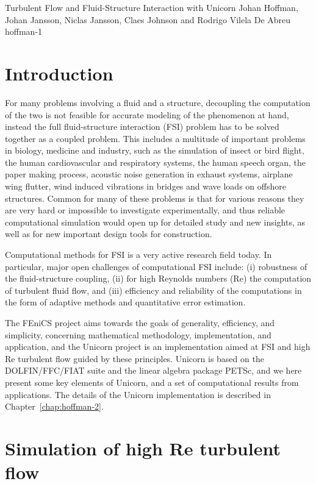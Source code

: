               {Turbulent Flow and Fluid-Structure Interaction with Unicorn} 
              {Johan Hoffman, Johan Jansson, Niclas Jansson, Claes Johnson and Rodrigo Vilela De Abreu}
              {hoffman-1}

\section{Introduction}

For many problems involving a fluid and a structure, decoupling the computation of the two is 
not feasible for accurate modeling of the phenomenon at hand, instead the full fluid-structure interaction (FSI) problem 
has to be solved together as a coupled problem. This includes a multitude of important 
problems in biology, medicine and industry, such as the simulation of insect or bird flight, the 
human cardiovascular and respiratory systems, the human speech organ, the paper making process, 
acoustic noise generation in exhaust systems, airplane wing flutter, wind induced vibrations in 
bridges and wave loads on offshore structures. Common for many of these problems is that 
for various reasons they are very hard or impossible to investigate experimentally, and thus 
reliable computational simulation would open up for detailed study and new insights, as well 
as for new important design tools for construction. 

Computational methods for FSI is a very active research field today. In particular, major open challenges of computational FSI include: (i) robustness of the fluid-structure coupling, (ii) for high Reynolds numbers (Re) the computation 
of turbulent fluid flow, and (iii) efficiency and reliability of the computations in the form of 
adaptive methods and quantitative error estimation. 

The FEniCS project aims towards the goals of generality, efficiency, and simplicity, concerning mathematical methodology, implementation, and application, and the Unicorn project is an implementation aimed at FSI and high Re turbulent flow guided by these principles. Unicorn is based on the DOLFIN/FFC/FIAT suite and the linear algebra package PETSc, and 
we here present some key elements of Unicorn, and a set of computational results from applications. The details of the Unicorn implementation is described in Chapter~\ref{chap:hoffman-2}. 

\section{Simulation of high Re turbulent flow}

